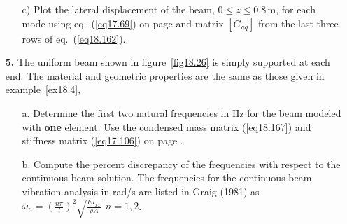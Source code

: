 \documentclass{AeroStructure-ERJohnson}
\begin{document}
\begin{exercise}
\begin{enumerate}[\textbf{2.}]
\begin{enumerate}[b)]
  \item[{\hskip13pt}c)] Plot the lateral displacement of the beam, $0 \leq z \leq 0.8\,\mathrm{m}$, for each mode using eq.~(\ref{eq17.69}) on page \pageref{eq17.69}\break\hspace*{34pt} and matrix $\left[G_{a q}\right]$ from the last three rows of eq.~(\ref{eq18.162}).
\end{enumerate}\enlargethispage{2\baselineskip}

\item[\textbf{5.}] The uniform beam shown in figure~\ref{fig18.26} is simply supported at each end. The material and geometric properties are the same as those given in example~\ref{ex18.4},

{\def\thefigure{18.26}
}

\begin{enumerate}[b)]
  \item[{\hskip13pt}a.] Determine the first two natural frequencies in Hz for the beam modeled with \textbf{one} element. Use the\break\hspace*{33pt} condensed mass matrix (\ref{eq18.167}) and stiffness matrix (\ref{eq17.106}) on page \pageref{eq17.106}.
  \item[{\hskip13pt}b.] Compute the percent discrepancy of the frequencies with respect to the continuous beam solution. The\break\hspace*{30pt} frequencies for the continuous beam vibration analysis in rad/s are listed in Graig (1981) as\break\hspace*{34pt} $\omega_{n}=\left(\frac{n \pi}{l}\right)^{2} \sqrt{\frac{E I_{x x}}{\rho A}}$ \quad $n=1,2$.
\end{enumerate}

\end{enumerate}
\end{exercise}



\clearemptydoublepage
\end{document}
